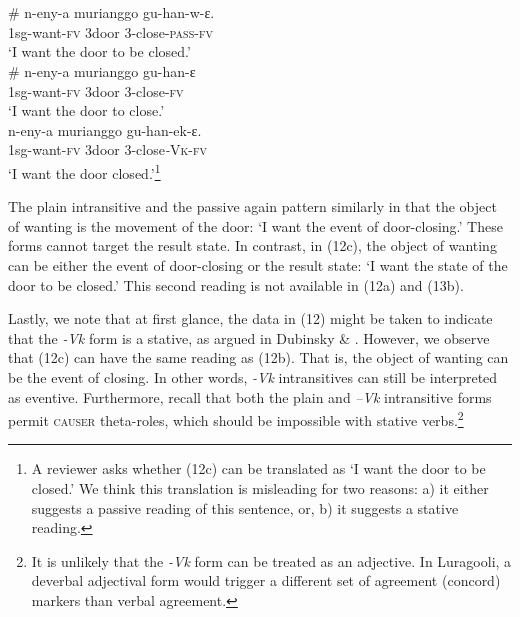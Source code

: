 \documentclass[output=paper]{langsci/langscibook}
\begin{document}
\ea\label{exx:}
{}\\
\ea\label{ex:}
\\
\gll   \# n-eny-a       murianggo gu-han-w-ɛ.\\
     \textit{  }1sg-want-\textsc{fv} 3door         3-close-\textsc{pass}-\textsc{fv}\\
\glt ‘I want the door to be closed.’
\ex
{}\\
\gll \textbf{  }\# n-eny-a       murianggo gu-han-ɛ\\
     \textit{  }1sg-want-\textsc{fv} 3door        3-close-\textsc{fv}\\
\glt ‘I want the door to close.’
\ex
{}\\
\gll \textbf{  }n-eny-a         murianggo gu-han-ek-ɛ.\\
     \textit{  }1sg-want-\textsc{fv} 3door        3-close\textit{-}\textsc{Vk}-\textsc{fv}\\
\glt ‘I want the door closed.’\footnote{ A reviewer asks whether (12c) can be translated as ‘I want the door to be closed.’ We think this translation is misleading for two reasons: a) it either suggests a passive reading of this sentence, or, b) it suggests a stative reading.}
\z
\z

The plain intransitive and the passive again pattern similarly in that the object of wanting is the movement of the door: ‘I want the event of door-closing.’ These forms cannot target the result state. In contrast, in (12c), the object of wanting can be either the event of door-closing or the result state: ‘I want the state of the door to be closed.’ This second reading is not available in (12a) and (13b).

Lastly, we note that at first glance, the data in (12) might be taken to indicate that the \textit{-Vk} form is a stative, as argued in Dubinsky \& \citet{Simango1996}. However, we observe that (12c) can have the same reading as (12b). That is, the object of wanting can be the event of closing. In other words, \textit{-Vk} intransitives can still be interpreted as eventive. Furthermore, recall that both the plain and \textit{–Vk }intransitive forms permit \textsc{causer} theta-roles, which should be impossible with stative verbs.\footnote{It is unlikely that the \textit{-Vk} form can be treated as an adjective. In Luragooli, a deverbal adjectival form would trigger a different set of agreement (concord) markers than verbal agreement.}
\end{document}
